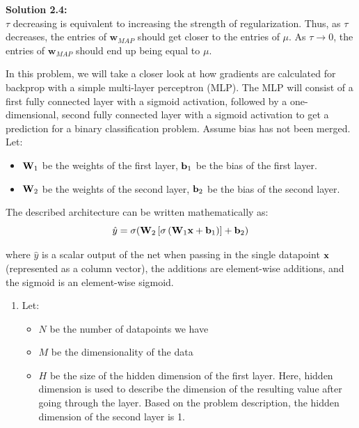 \documentclass[submit]{harvardml}
\begin{document}
\noindent\textbf{Solution 2.4:}\\
$\tau$ decreasing is equivalent to increasing the strength of regularization. Thus, as $\tau$ decreases, the entries of $\mathbf{w}_{MAP}$ should get closer to the entries of $\mu$. As $\tau \to 0$, the entries of $\mathbf{w}_{MAP}$ should end up being equal to $\mu$.

\newpage

\begin{problem}

  In this problem, we will take a closer look at how gradients are calculated for backprop with a simple multi-layer perceptron (MLP). The MLP will consist of a first fully connected layer with a sigmoid activation, followed by a one-dimensional, second fully connected layer with a sigmoid activation to get a prediction for a binary classification problem. Assume bias has not been merged. Let:
  \begin{itemize}
      \item $\bold{W}_1$ be the weights of the first layer, $\bold{b}_1$ be the bias of the first layer.
      \item $\bold{W}_2$ be the weights of the second layer, $\bold{b}_2$ be the bias of the second layer.
  \end{itemize}
  
  The described architecture can be written mathematically as: $$\hat{y} = \sigma(\bold{W}_2 \left[\sigma \left(\bold{W}_1 \bold{x} + \bold{b}_1\right)\right] + \bold{b}_2)$$
  
  where $\hat{y}$ is a scalar output of the net when passing in the single datapoint $\bold{x}$ (represented as a column vector), the additions are element-wise additions, and the sigmoid is an element-wise sigmoid.
  
  \begin{enumerate}
      \item Let:
      \begin{itemize}
          \item $N$ be the number of datapoints we have
          \item $M$ be the dimensionality of the data
          \item $H$ be the size of the hidden dimension of the first layer. Here, hidden dimension is used to describe the dimension of the resulting value after going through the layer. Based on the problem description, the hidden dimension of the second layer is 1.
      \end{itemize}
      

\end{enumerate}
\end{problem}
\end{document}
